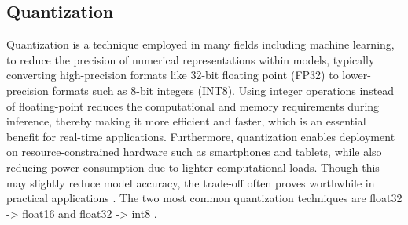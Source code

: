 \documentclass[licencjacka,en]{pracamgr}
\begin{document}



\subsection{Quantization}
Quantization is a technique employed in many fields including machine learning, to reduce the precision of numerical representations within models, typically converting high-precision formats like 32-bit floating point (FP32) to lower-precision formats such as 8-bit integers (INT8). Using integer operations instead of floating-point reduces the computational and memory requirements during inference, thereby making it more efficient and faster, which is an essential benefit for real-time applications. Furthermore, quantization enables deployment on resource-constrained hardware such as smartphones and tablets, while also reducing power consumption due to lighter computational loads. Though this may slightly reduce model accuracy, the trade-off often proves worthwhile in practical applications \cite{ibm_quantization}.
The two most common quantization techniques are float32 -> float16 and float32 -> int8 \cite{quant_hf}.
\end{document}
